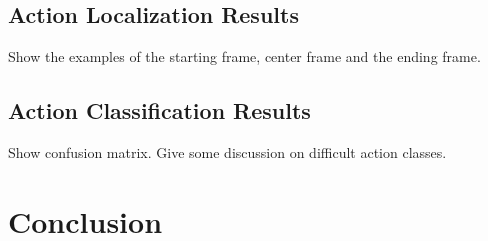\documentclass[10pt,twocolumn,letterpaper]{article}
\begin{document}






\subsection{Action Localization Results}
Show the examples of the starting frame, center frame and the ending frame.

\subsection{Action Classification Results}
Show confusion matrix.
Give some discussion on difficult action classes.

\section{Conclusion}
\end{document}
